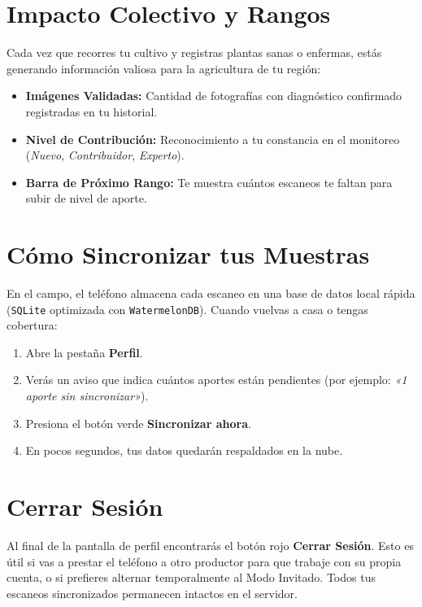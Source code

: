 \documentclass[11pt,a4paper]{report}
\begin{document}
\begin{minipage}[t]{0.62\textwidth}
    \vspace{0pt}
    \section{Impacto Colectivo y Rangos}
    Cada vez que recorres tu cultivo y registras plantas sanas o enfermas, estás generando información valiosa para la agricultura de tu región:
    \begin{itemize}[leftmargin=1.2em,itemsep=2pt]
        \item \textbf{Imágenes Validadas:} Cantidad de fotografías con diagnóstico confirmado registradas en tu historial.
        \item \textbf{Nivel de Contribución:} Reconocimiento a tu constancia en el monitoreo (\textit{Nuevo}, \textit{Contribuidor}, \textit{Experto}).
        \item \textbf{Barra de Próximo Rango:} Te muestra cuántos escaneos te faltan para subir de nivel de aporte.
    \end{itemize}

    \vspace{2mm}
    \section{Cómo Sincronizar tus Muestras}
    En el campo, el teléfono almacena cada escaneo en una base de datos local rápida (\texttt{SQLite} optimizada con \texttt{WatermelonDB}). Cuando vuelvas a casa o tengas cobertura:
    \begin{enumerate}[leftmargin=1.2em,itemsep=2pt]
        \item Abre la pestaña \textbf{Perfil}.
        \item Verás un aviso que indica cuántos aportes están pendientes (por ejemplo: \textit{«1 aporte sin sincronizar»}).
        \item Presiona el botón verde \textbf{Sincronizar ahora}.
        \item En pocos segundos, tus datos quedarán respaldados en la nube.
    \end{enumerate}
\end{minipage}

\vspace{4mm}
\section{Cerrar Sesión}
Al final de la pantalla de perfil encontrarás el botón rojo \textbf{Cerrar Sesión}. Esto es útil si vas a prestar el teléfono a otro productor para que trabaje con su propia cuenta, o si prefieres alternar temporalmente al Modo Invitado. Todos tus escaneos sincronizados permanecen intactos en el servidor.
\end{document}
